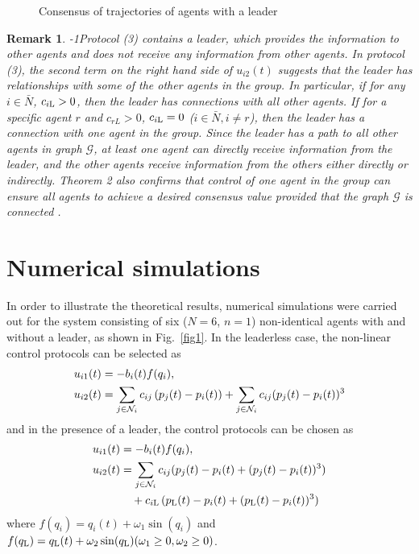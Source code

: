 \documentclass{cta-author}
\newtheorem{remark}{Remark}{}
\begin{document}
\begin{figure}[!t]
\caption{Consensus of trajectories of agents with a leader
\label{fig3}}
\end{figure}

\begin{remark}\label{rem3}
\looseness-1Protocol (3) contains a leader, which
provides the information to other agents and does not receive any
information from other agents. In protocol (3), the second term on
the right hand side of $u_{i2}(t)$ suggests that the leader has
relationships with some of the other agents in the group. In
particular, if for any $i\in\bar{N}$, $c_{i{\rm L}}>0 $, then the leader
has connections with all other agents. If for a specific agent $r$ and
$c_{rL}>0$, $c_{i{\rm L}}=0$ ($i\in\bar{N}, i\neq r$), then the leader has
a connection with one agent in the group. Since the leader has
a path to all other agents in graph $\mathcal{G}$, at least one agent can directly
receive information from the leader, and the other agents receive
information from the others either directly or indirectly. Theorem 2
also confirms that control of one agent in the group can ensure all
agents to achieve a desired consensus value provided that the graph
$\mathcal{G}$ is connected .
\end{remark}

\section{Numerical simulations}\label{sec4}

In order to illustrate the theoretical results, numerical
simulations were carried out for the system consisting of six
($N=6$, $n=1$) non-identical agents with and without a leader, as
shown in Fig.~\ref{fig1}. In the leaderless case, the non-linear control
protocols can be selected as
\begin{align}
u_{i1}(t) &= -b_{i}(t) f(q_{i}),\notag\\
u_{i2}(t)&=\sum_{j \in
\mathcal{N}_{i}}c_{ij} \,(p_{j}(t)-p_{i}(t))+\sum_{j \in
\mathcal{N}_{i}}c_{ij}(p_{j}(t)-p_{i}(t))^{3}\label{eq9}
\end{align}
and in the presence of a leader, the control protocols can be chosen as
\begin{align}
u_{i1}(t)&=-b_{i}(t)f(q_{i}),\notag\\
u_{i2}(t)&=\sum_{j\in\mathcal{N}_{i}}c_{ij}
(p_{j}(t)-p_{i}(t)+(p_{j}(t)-p_{i}(t))^{3})\notag\\
&\quad +c_{i{\rm L}}\, (p_{\rm L}(t)-p_{i}(t)+(p_{\rm L}(t)-p_{i}(t))^{3})\label{eq10}
\end{align}
where $f(q_{i})=q_{i}(t)+\omega_{1}\sin(q_{i})$ and
$f(q_{\rm L})=q_{\rm L}(t)+\omega_{2} \sin(q_{\rm L})\break (\omega_{1}\geq 0,
\omega_{2}\geq 0)$.
\end{document}
